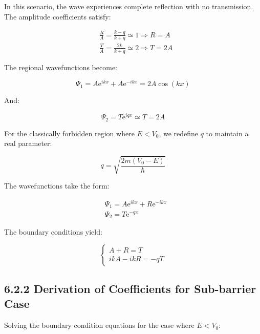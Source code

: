 \documentclass[10pt]{article}
\begin{document}
In this scenario, the wave experiences complete reflection with no transmission. The amplitude coefficients satisfy:

\begin{align*}
& \frac{R}{A}=\frac{k-q}{k+q} \simeq 1 \Longrightarrow R=A  \tag{6.34}\\
& \frac{T}{A}=\frac{2 k}{k+q} \simeq 2 \Longrightarrow T=2 A
\end{align*}

The regional wavefunctions become:

\begin{equation*}
\Psi_{1}=A \mathrm{e}^{i k x}+A \mathrm{e}^{-i k x}=2 A \cos (k x) \tag{6.35}
\end{equation*}

And:

\begin{equation*}
\Psi_{2}=T \mathrm{e}^{i q x} \simeq T=2 A \tag{6.36}
\end{equation*}

For the classically forbidden region where $E<V_{0}$, we redefine $q$ to maintain a real parameter:

\begin{equation*}
q=\sqrt{\frac{2 m\left(V_{0}-E\right)}{\hbar}} \tag{6.37}
\end{equation*}

The wavefunctions take the form:

\begin{align*}
& \Psi_{1}=A \mathrm{e}^{i k x}+R \mathrm{e}^{-i k x} \\
& \Psi_{2}=T \mathrm{e}^{-q x} \tag{6.38}
\end{align*}

The boundary conditions yield:

\[
\left\{\begin{array}{l}
A+R=T  \tag{6.39}\\
i k A-i k R=-q T
\end{array}\right.
\]


\subsection*{6.2.2 Derivation of Coefficients for Sub-barrier Case}

Solving the boundary condition equations for the case where $E<V_0$:
\end{document}
